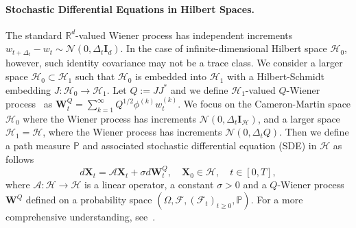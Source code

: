 \documentclass[nohyperref]{article}
\theoremstyle{plain}
\theoremstyle{remark}
\newcommand{\mc}{\mathcal}
\newcommand{\mb}{\mathbf}
\begin{document}
\paragraph{Stochastic Differential Equations in Hilbert Spaces.}
The standard $\mathbb{R}^d$-valued Wiener process has independent increments $w_{t + \Delta_t} - w_t \sim \mc{N}(0, \Delta_t\mb{I}_d)$. 
In the case of infinite-dimensional Hilbert space $\mc{H}_0$, however, such identity covariance may not be a trace class. 
We consider a larger space $\mc{H}_0 \subset \mc{H}_1$ such that $\mc{H}_0$ is embedded into $\mc{H}_1$ with a Hilbert-Schmidt embedding $J : \mc{H}_0 \to \mc{H}_1$.
Let $Q := J J^{*}$ and we define $\mc{H}_1$-valued $Q$-Wiener process~\citep[Proposition~4.7]{da2014stochastic} as $\mb{W}^Q_t = \sum_{k=1}^{\infty}Q^{1/2} \phi^{(k)} w^{(k)}_t$. 
We focus on the Cameron-Martin space $\mc{H}_0$ where the Wiener process has increments $\mc{N}(0, \Delta_t\mb{I}_{\mc{H}})$, and a larger space $\mc{H}_1 = \mc{H}$, where the Wiener process has increments $\mc{N}(0, \Delta_tQ)$. 
Then we define a path measure $\mathbb{P}$ and associated stochastic differential equation (SDE) in $\mc{H}$ as follows
\begin{equation}\label{eq:uncontrolled SDE}
    d\mb{X}_t = \mc{A} \mb{X}_t + \sigma d\mb{W}^Q_t, \quad \mb{X}_0 \in \mc{H}, \quad t \in [0, T],
\end{equation}
where $\mc{A} : \mc{H} \to \mc{H}$ is a linear operator, a constant $\sigma >0$ and a $Q$-Wiener process $\mb{W}^{Q}$ defined on a probability space $(\Omega, \mc{F}, (\mc{F}_t)_{t \geq 0}, \mathbb{P})$. 
For a more comprehensive understanding, see~\citep{gawarecki2010stochastic, da2014stochastic}.
\end{document}
